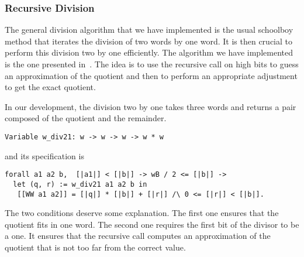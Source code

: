 \subsubsection{Recursive Division}
The general division algorithm that we have implemented is the usual schoolboy 
method that iterates the division of two words by one word. 
It is then crucial to perform this division two by one efficiently. 
The algorithm we have implemented is the one presented in~\cite{RecDiv}.
The idea is to use the recursive call on high bits to guess an approximation 
of the quotient and  then to perform an appropriate adjustment to get the exact quotient.

In our development, the division two by one takes
three words and returns a pair composed of the quotient and the remainder.
\begin{verbatim}
Variable w_div21: w -> w -> w -> w * w
\end{verbatim}
and its specification is 
\begin{verbatim}
forall a1 a2 b,  [|a1|] < [|b|] -> wB / 2 <= [|b|] -> 
  let (q, r) := w_div21 a1 a2 b in
   [[WW a1 a2]] = [|q|] * [|b|] + [|r|] /\ 0 <= [|r|] < [|b|].
\end{verbatim}
The two conditions deserve some explanation.
The first one ensures that the quotient fits in one word.
The second one requires the first bit of the divisor to be a 
one. It ensures that the recursive call computes an approximation 
of the quotient that is not too far from the correct value.


